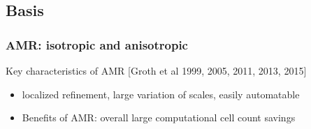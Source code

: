 \documentclass{beamer}
\begin{document}
\subsection{Basis}
\begin{frame}%
\frametitle{AMR: isotropic and anisotropic}
\tiny
\begin{minipage}[t][1\textheight]{1\textwidth}
\vspace{-15pt}
\begin{exampleblock}{Key characteristics of AMR}
[Groth et al 1999, 2005, 2011, 2013, 2015]
\begin{itemize}
\tiny
\item localized refinement, large variation of scales, easily automatable
\item Benefits of AMR: overall large computational cell count savings
\end{itemize}
\vspace{-20pt}
\begin{figure}
\label{fig:cubeAMRbased}
\centering
{}
\end{figure}
\end{exampleblock}
\end{minipage}

\end{frame}


\end{document}
